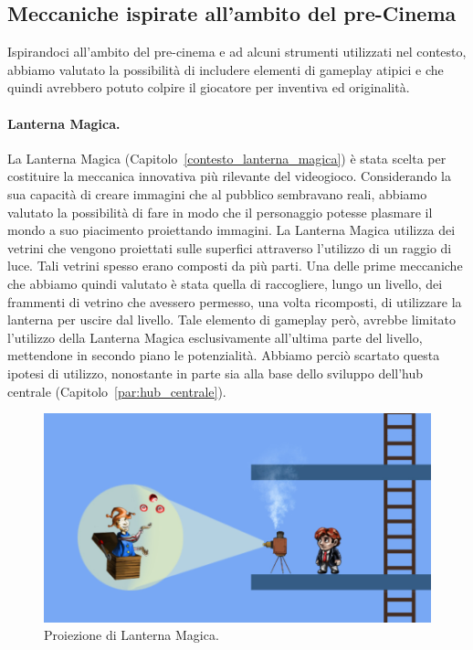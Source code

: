 \subsection{Meccaniche ispirate all'ambito del pre-Cinema}
\label{sec:meccaniche_precinema}

Ispirandoci all’ambito del pre-cinema e ad alcuni strumenti utilizzati nel contesto, abbiamo valutato la possibilità di includere elementi di gameplay atipici e che quindi avrebbero potuto colpire il giocatore per inventiva ed originalità.

\paragraph{Lanterna Magica.}
La Lanterna Magica (Capitolo~\ref{contesto_lanterna_magica}) è stata scelta per costituire la meccanica innovativa più rilevante del videogioco. Considerando la sua capacità di creare immagini che al pubblico sembravano reali, abbiamo valutato la possibilità di fare in modo che il personaggio potesse plasmare il mondo a suo piacimento proiettando immagini.
La Lanterna Magica utilizza dei vetrini che vengono proiettati sulle superfici attraverso l’utilizzo di un raggio di luce. Tali vetrini spesso erano composti da più parti. Una delle prime meccaniche che abbiamo quindi valutato è stata quella di raccogliere, lungo un livello, dei frammenti di vetrino che avessero permesso, una volta ricomposti, di utilizzare la lanterna per uscire dal livello.
Tale elemento di gameplay però, avrebbe limitato l’utilizzo della Lanterna Magica esclusivamente all’ultima parte del livello, mettendone in secondo piano le potenzialità. Abbiamo perciò scartato questa ipotesi di utilizzo, nonostante in parte sia alla base dello sviluppo dell’hub centrale (Capitolo~\ref{par:hub_centrale}).

\begin{figure}%
	\centering
	\includegraphics[width= 0.85\columnwidth]{images/gameDesign/17_giocoliere.jpg}
	\caption{Proiezione di Lanterna Magica.}
	\label{fig:meccaniche_precinema_lanterna01}
\end{figure}

